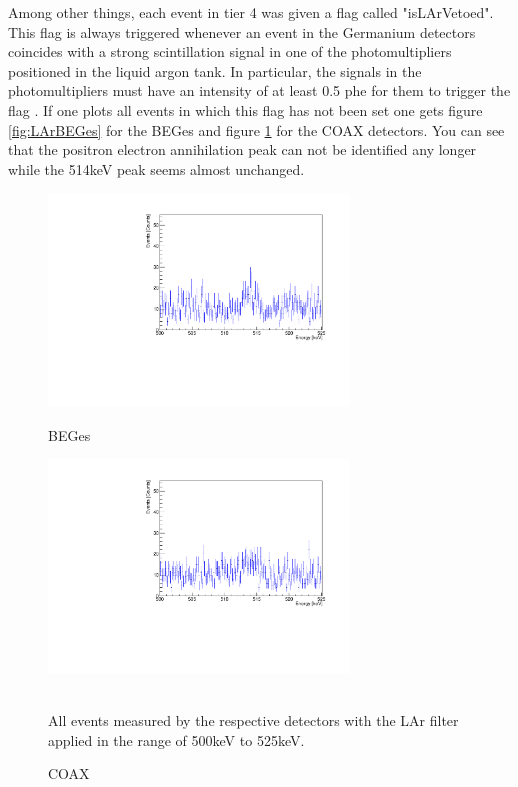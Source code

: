Among other things, each event in tier 4 was given a flag called "isLArVetoed".
This flag is always triggered whenever an event in the Germanium detectors coincides with a strong scintillation signal in one of the photomultipliers positioned in the liquid argon tank.
In particular, the signals in the photomultipliers must have an intensity of at least 0.5 phe for them to trigger the flag \cite{agostini_allardt_bakalyarov_barabanov_baudis_bauer_bellotti_belogurov_belyaev_benato_et al._2017}.
If one plots all events in which this flag has not been set one gets figure \ref{fig:LArBEGes} for the BEGes and figure \ref{fig:LArCOAX} for the COAX detectors.
You can see that the positron electron annihilation peak can not be identified any longer while the 514keV peak seems almost unchanged.
\\

\begin{figure}[t!]
\centering
\begin{minipage}{.5\textwidth}
  \centering
	\includegraphics[width=80mm]{./Bilder/500525LArVetoBEGes.pdf}
    \caption{BEGes}
  \label{fig:LArBEGes}
\end{minipage}%
\begin{minipage}{.5\textwidth}
  \centering
	\includegraphics[width=80mm]{./Bilder/500525LArVetoCOAX.pdf}
  \caption{COAX}
  \label{fig:LArCOAX}
\end{minipage}
    \\
	\vspace{0.5cm}
    All events measured by the respective detectors with the LAr filter applied in the range of 500keV to 525keV.
\end{figure}

